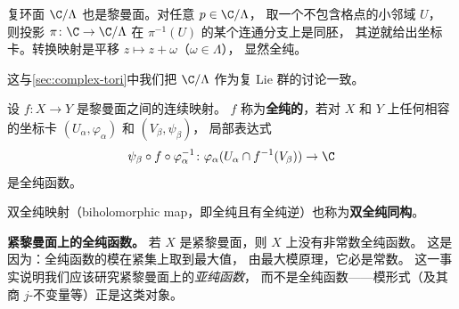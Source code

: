 \begin{example}[复环面是黎曼面]
\label{ex:torus-riemann-surface}
复环面 $\C/\Lambda$ 也是黎曼面。对任意 $p \in \C/\Lambda$，
取一个不包含格点的小邻域 $U$，
则投影 $\pi\colon \C \to \C/\Lambda$ 在 $\pi^{-1}(U)$ 的某个连通分支上是同胚，
其逆就给出坐标卡。转换映射是平移 $z \mapsto z + \omega$（$\omega \in \Lambda$），
显然全纯。

这与\cref{sec:complex-tori}中我们把 $\C/\Lambda$ 作为复 Lie 群的讨论一致。
\end{example}

\begin{definition}[黎曼面之间的全纯映射]
\label{def:holomorphic-map-riemann}
设 $f\colon X \to Y$ 是黎曼面之间的连续映射。
$f$ 称为\textbf{全纯的}，若对 $X$ 和 $Y$ 上任何相容的坐标卡
$(U_\alpha, \varphi_\alpha)$ 和 $(V_\beta, \psi_\beta)$，
局部表达式
\[
  \psi_\beta \circ f \circ \varphi_\alpha^{-1}\colon
  \varphi_\alpha(U_\alpha \cap f^{-1}(V_\beta)) \to \C
\]
是全纯函数。

双全纯映射（biholomorphic map，即全纯且有全纯逆）也称为\textbf{双全纯同构}。
\end{definition}

\textbf{紧黎曼面上的全纯函数。}
若 $X$ 是紧黎曼面，则 $X$ 上没有非常数全纯函数。
这是因为：全纯函数的模在紧集上取到最大值，
由最大模原理，它必是常数。
这一事实说明我们应该研究紧黎曼面上的\emph{亚纯函数}，
而不是全纯函数——模形式（及其商 $j$-不变量等）正是这类对象。
